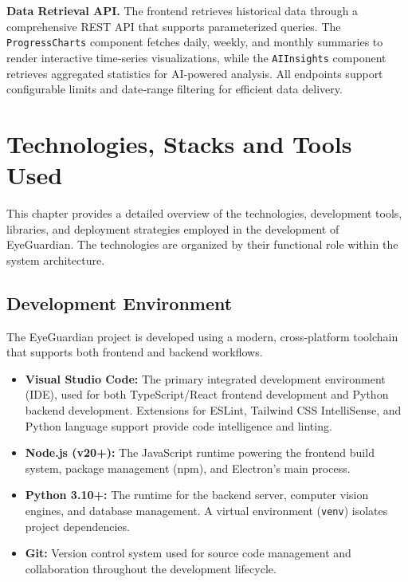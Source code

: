 \documentclass[12pt]{report}
\begin{document}
\textbf{Data Retrieval API.} The frontend retrieves historical data through a comprehensive REST API that supports parameterized queries. The \texttt{ProgressCharts} component fetches daily, weekly, and monthly summaries to render interactive time‑series visualizations, while the \texttt{AIInsights} component retrieves aggregated statistics for AI‑powered analysis. All endpoints support configurable limits and date‑range filtering for efficient data delivery.


\chapter{Technologies, Stacks and Tools Used}

This chapter provides a detailed overview of the technologies, development tools, libraries, and deployment strategies employed in the development of EyeGuardian. The technologies are organized by their functional role within the system architecture.

\section{Development Environment}

The EyeGuardian project is developed using a modern, cross‑platform toolchain that supports both frontend and backend workflows.

\begin{itemize}
    \item \textbf{Visual Studio Code:} The primary integrated development environment (IDE), used for both TypeScript/React frontend development and Python backend development. Extensions for ESLint, Tailwind CSS IntelliSense, and Python language support provide code intelligence and linting.
    \item \textbf{Node.js (v20+):} The JavaScript runtime powering the frontend build system, package management (npm), and Electron's main process.
    \item \textbf{Python 3.10+:} The runtime for the backend server, computer vision engines, and database management. A virtual environment (\texttt{venv}) isolates project dependencies.
    \item \textbf{Git:} Version control system used for source code management and collaboration throughout the development lifecycle.
\end{itemize}
\end{document}
